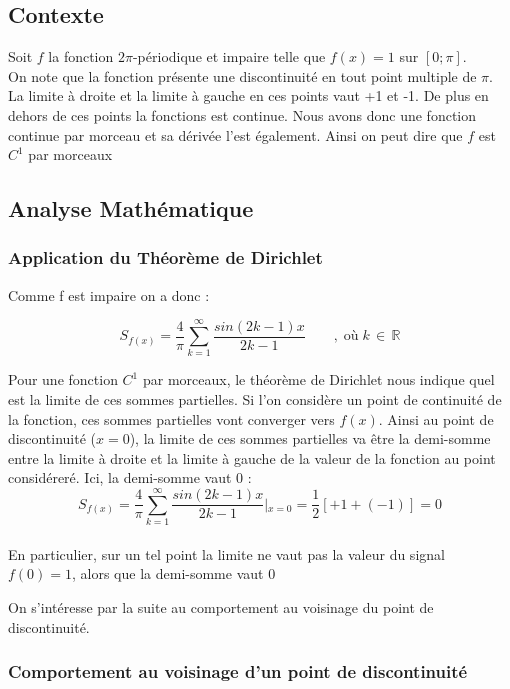 \documentclass[a4paper,12pt]{report}
\begin{document}
	\subsection{Contexte}
Soit $f$ la fonction $2\pi$-p\'eriodique et impaire telle que $f(x) = 1$ sur $[0; \pi]$.\\

On note que la fonction pr\'esente une discontinuit\'e en tout point multiple de $\pi$. La limite \`a droite et la limite \`a gauche en ces points vaut +1 et -1. De plus en dehors de ces points la fonctions est continue. Nous avons donc une fonction continue par morceau et sa d\'eriv\'ee l'est \'egalement. Ainsi on peut dire que $f$ est $C^{1}$ par morceaux
	\subsection{Analyse Math\'ematique}
		\subsubsection{Application du Th\'eor\`eme de Dirichlet}
Comme f est impaire on a donc :

\[S_{f(x)}=\frac{4}{\pi}\sum\limits_{k=1}^{\infty}\frac{sin(2k-1)x}{2k-1}\qquad,\;\text{o\`u}\;k\,\in\,\pmb{\mathbb{R}}\]


Pour une fonction $C^{1}$ par morceaux, le th\'eor\`eme de Dirichlet nous indique quel est la limite de ces sommes partielles. Si l'on consid\`ere un point de continuit\'e de la fonction, ces sommes partielles vont converger vers $f(x)$.  Ainsi au point de discontinuit\'e ($x=0$), la limite de ces sommes partielles va \^etre la demi-somme entre la limite \`a droite et la limite \`a gauche de la valeur de la fonction au point consid\'erer\'e. Ici, la demi-somme vaut $0$ :\\


\[S_{f(x)}=\frac{4}{\pi}\sum\limits_{k=1}^{\infty}\frac{sin(2k-1)x}{2k-1} \left\vert{_{x=0}}\right. = \frac{1}{2}[+1+(-1)] = 0\]\\

En particulier, sur un tel point la limite ne vaut pas la valeur du signal $f(0)=1$, alors que la demi-somme vaut $0$

On s'int\'eresse par la suite au comportement au voisinage du point de discontinuit\'e.

		\subsubsection{Comportement au voisinage d'un point de discontinuit\'e}
\end{document}
